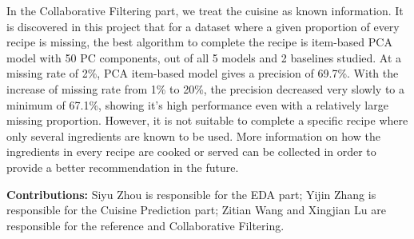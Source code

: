 \documentclass{article}
\begin{document}
In the Collaborative Filtering part, we treat the cuisine as known information. It is discovered in this project that for a dataset where a given proportion of every recipe is missing, the best algorithm to complete the recipe is item-based PCA model with 50 PC components, out of all 5 models and 2 baselines studied. At a missing rate of 2\%, PCA item-based model gives a precision of 69.7\%. With the increase of missing rate from 1\% to 20\%, the precision decreased very slowly to a minimum of 67.1\%, showing it's high performance even with a relatively large missing proportion. However, it is not suitable to complete a specific recipe where only several ingredients are known to be used. More information on how the ingredients in every recipe are cooked or served can be collected in order to provide a better recommendation in the future.
\newpage
\printbibliography

\textbf{Contributions:}
Siyu Zhou is responsible for the EDA part; Yijin Zhang is responsible for the Cuisine Prediction part; Zitian Wang and Xingjian Lu are responsible for the reference and Collaborative Filtering.
\end{document}
